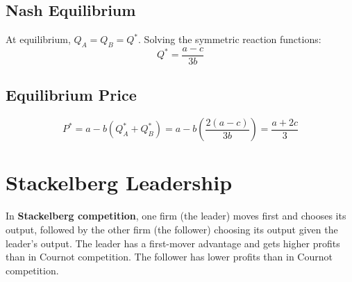 \subsection*{Nash Equilibrium}
At equilibrium, \(Q_A = Q_B = Q^*\). Solving the symmetric reaction functions:
\[
Q^* = \frac{a - c}{3b}
\]

\subsection*{Equilibrium Price}
\[
P^* = a - b(Q_A^* + Q_B^*) = a - b\left(\frac{2(a - c)}{3b}\right) = \frac{a + 2c}{3}
\]

\section*{Stackelberg Leadership}
In \textbf{Stackelberg competition}, one firm (the leader) moves first and chooses its output, followed by the other firm (the follower) choosing its output given the leader's output. The leader has a first-mover advantage and gets higher profits than in Cournot competition. The follower has lower profits than in Cournot competition.
